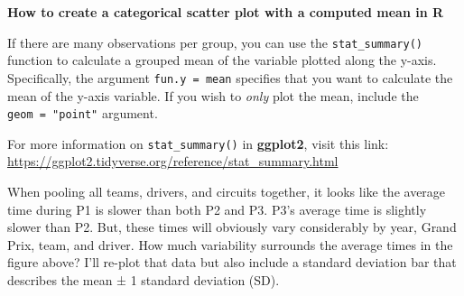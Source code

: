 \documentclass[
]{book}
\begin{document}
\begin{blackbox}

\begin{center}
\textbf{How to create a categorical scatter plot with a computed mean in R}

\end{center}

If there are many observations per group, you can use the \texttt{stat\_summary()} function to calculate a grouped mean of the variable plotted along the y-axis. Specifically, the argument \texttt{fun.y\ =\ mean} specifies that you want to calculate the mean of the y-axis variable. If you wish to \emph{only} plot the mean, include the \texttt{geom\ =\ "point"} argument.

For more information on \texttt{stat\_summary()} in \textbf{ggplot2}, visit this link: \url{https://ggplot2.tidyverse.org/reference/stat_summary.html}

\end{blackbox}

When pooling all teams, drivers, and circuits together, it looks like the average time during P1 is slower than both P2 and P3. P3's average time is slightly slower than P2. But, these times will obviously vary considerably by year, Grand Prix, team, and driver. How much variability surrounds the average times in the figure above? I'll re-plot that data but also include a standard deviation bar that describes the mean ± 1 standard deviation (SD).
\end{document}
